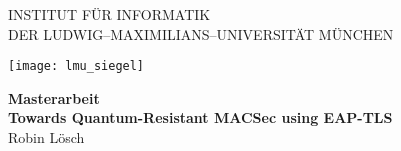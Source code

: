 
\thispagestyle{empty}

\begin{center}

\vspace*{-2cm}

{\Huge INSTITUT FÜR INFORMATIK\\[1mm]}
DER LUDWIG--MAXIMILIANS--UNIVERSITÄT MÜNCHEN\\

\vspace*{1cm}

\texttt{[image: lmu\_siegel]}

\vspace*{2cm}

{\Large \textbf{Masterarbeit}}\\ %

\vspace{2.0cm}
{\Huge \textbf{Towards Quantum-Resistant MACSec using EAP-TLS}}\\

{\LARGE Robin Lösch} %

\vspace{3cm}

\end{center}

\newpage


\thispagestyle{empty}
\cleardoublepage


\thispagestyle{empty}

